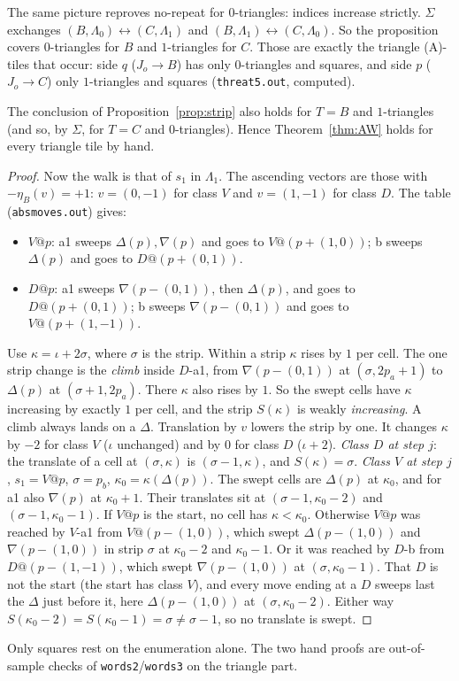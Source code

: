 \documentclass[11pt]{article}
\theoremstyle{definition}\newtheorem{definition}[theorem]{Definition}\newtheorem{remark}[theorem]{Remark}
\begin{document}
\noindent The same picture reproves no-repeat for $0$-triangles: indices increase strictly.
$\Sigma$ exchanges $(B,\Lambda_0)\leftrightarrow(C,\Lambda_1)$ and $(B,\Lambda_1)\leftrightarrow(C,\Lambda_0)$. So the proposition covers $0$-triangles for $B$ and $1$-triangles for $C$.
Those are exactly the triangle (A)-tiles that occur: side $q$ ($J_o\to B$) has only $0$-triangles and squares, and side $p$ ($J_o\to C$) only $1$-triangles and squares (\texttt{threat5.out}, computed).
\begin{proposition}\label{prop:strip2}
The conclusion of Proposition~\ref{prop:strip} also holds for $T=B$ and $1$-triangles (and so, by $\Sigma$, for $T=C$ and $0$-triangles). Hence Theorem~\ref{thm:AW} holds for every triangle tile by hand.
\end{proposition}
\begin{proof}
Now the walk is that of $s_1$ in $\Lambda_1$. The ascending vectors are those with $-\eta_B(v)=+1$: $v=(0,-1)$ for class $V$ and $v=(1,-1)$ for class $D$. The table (\texttt{absmoves.out}) gives:
\begin{itemize}
\item $V@p$: a1 sweeps $\Delta(p),\nabla(p)$ and goes to $V@(p+(1,0))$; b sweeps $\Delta(p)$ and goes to $D@(p+(0,1))$.
\item $D@p$: a1 sweeps $\nabla(p-(0,1))$, then $\Delta(p)$, and goes to $D@(p+(0,1))$; b sweeps $\nabla(p-(0,1))$ and goes to $V@(p+(1,-1))$.
\end{itemize}
Use $\kappa=\iota+2\sigma$, where $\sigma$ is the strip. Within a strip $\kappa$ rises by $1$ per cell. The one strip change is the \emph{climb} inside $D$-a1, from $\nabla(p-(0,1))$ at $(\sigma,2p_a+1)$ to $\Delta(p)$ at $(\sigma+1,2p_a)$. There $\kappa$ also rises by $1$.
So the swept cells have $\kappa$ increasing by exactly $1$ per cell, and the strip $S(\kappa)$ is weakly \emph{increasing}. A climb always lands on a $\Delta$.
Translation by $v$ lowers the strip by one. It changes $\kappa$ by $-2$ for class $V$ ($\iota$ unchanged) and by $0$ for class $D$ ($\iota+2$).
\emph{Class $D$ at step $j$}: the translate of a cell at $(\sigma,\kappa)$ is $(\sigma-1,\kappa)$, and $S(\kappa)=\sigma$.
\emph{Class $V$ at step $j$}, $s_1=V@p$, $\sigma=p_b$, $\kappa_0=\kappa(\Delta(p))$. The swept cells are $\Delta(p)$ at $\kappa_0$, and for a1 also $\nabla(p)$ at $\kappa_0+1$. Their translates sit at $(\sigma-1,\kappa_0-2)$ and $(\sigma-1,\kappa_0-1)$.
If $V@p$ is the start, no cell has $\kappa<\kappa_0$. Otherwise $V@p$ was reached by $V$-a1 from $V@(p-(1,0))$, which swept $\Delta(p-(1,0))$ and $\nabla(p-(1,0))$ in strip $\sigma$ at $\kappa_0-2$ and $\kappa_0-1$. Or it was reached by $D$-b from $D@(p-(1,-1))$, which swept $\nabla(p-(1,0))$ at $(\sigma,\kappa_0-1)$. That $D$ is not the start (the start has class $V$), and every move ending at a $D$ sweeps last the $\Delta$ just before it, here $\Delta(p-(1,0))$ at $(\sigma,\kappa_0-2)$.
Either way $S(\kappa_0-2)=S(\kappa_0-1)=\sigma\ne\sigma-1$, so no translate is swept.
\end{proof}
\noindent Only squares rest on the enumeration alone. The two hand proofs are out-of-sample checks of \texttt{words2}/\texttt{words3} on the triangle part.
\end{document}

